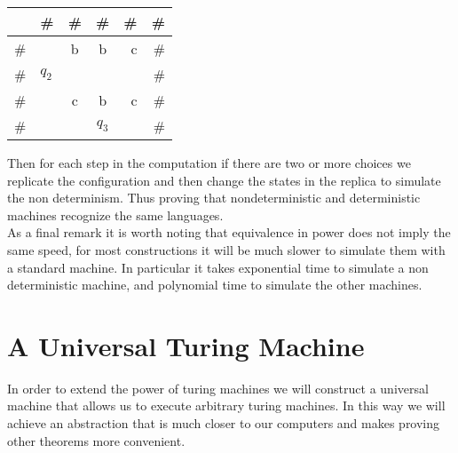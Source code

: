\documentclass[11pt]{exam}
\begin{document}
\begin{center}
\begin{tabular}{l | l | c | c | r | r }
\hline
& \# & \# & \# & \# & \#\\
\hline
\#  & & b & b & c & \#\\
\hline
\#  & $q_2$ &  &  &  & \#\\
\hline
\#  & & c & b & c & \#\\
\hline
\#  & &  & $q_3$ &  & \#\\
\hline
\end{tabular}
\end{center}
Then for each step in the computation if there are two or more choices we replicate the configuration and then change the states in the replica to simulate the non determinism. Thus proving that nondeterministic and deterministic machines recognize the same languages.\\

As a final remark it is worth noting that equivalence in power does not imply the same speed, for most constructions it will be much slower to simulate them with a standard machine. In particular it takes exponential time to simulate a non deterministic machine, and polynomial time to simulate the other machines.

\newpage

\section{A Universal Turing Machine}

In order to extend the power of turing machines we will construct a universal machine that allows us to execute arbitrary turing machines. In this way we will achieve an abstraction that is much closer to our computers and makes proving other theorems more convenient. \\
\end{document}
